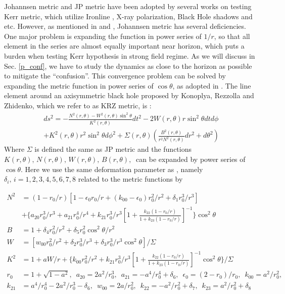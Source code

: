 \documentclass{article}
\begin{document}
Johannsen metric and JP metric have been adopted by several works on testing Kerr metric, which utilize Ironline\cite{t1_Iron} \cite{t4_Iron}, X-ray polarization\cite{t2_XrayPol}, Black Hole shadows\cite{t3_BHShadow} and etc. However, as mentioned in \cite{johannsen_diff} and \cite {KRZ}, Johannsen metric has several deficiencies. One major problem is expanding the function in power series of $1/r$, so that all element in the series are almost equally important near horizon, which puts a burden when testing Kerr hypothesis in strong field regime. As we will discuss in Sec. \ref{p_conf}, we have to study the dynamics as close to the horizon as possible to mitigate the ``confusion''. This convergence problem can be solved by expanding the metric function in power series of $\cos \theta$, as adopted in \cite{KRZ}. The line element around an axisymmetric black hole proposed by Konoplya, Rezzolla and Zhidenko, which we refer to as KRZ metric, is \cite{KRZ}:
\begin{equation}
\begin{aligned}
	ds^2=-\frac{N^2(r,\theta)-W^2(r,\theta)\sin^2\theta}{K^2(r,\theta)} dt^2-2W(r,\theta)r\sin^2\theta dtd\phi \\+ K^2(r,\theta) r^2\sin^2\theta d\phi^2  +\Sigma(r,\theta)(\frac{B^2(r,\theta)}{r^2 N^2(r,\theta)} dr^2+d\theta^2)
\end{aligned}
\end{equation}
Where $\Sigma$ is defined the same as JP metric and the functions $K(r,\theta),\, N(r,\theta),\, W(r,\theta),\, B(r,\theta),\ $ can be expanded by power series of $\cos\theta$. Here we use the same deformation parameter as \cite{cosimoKRZ}, namely $\delta_i, \, i=1,2,3,4,5,6,7,8$ related to the metric functions by

\begin{equation}
\begin{aligned}
N^2&=(1-r_0/r)[ 1-\epsilon_0r_0/r +(k_{00}-\epsilon_0)r_0^2/r^2 +\delta_1 r_0^3/r^3 ] \\
&+ \{ a_{20} r_0^3/r^3 +a_{21} r_0^4/r^4 + k_{21}r_0^3/r^3[ 1+\frac{k_{22}(1-r_0/r) }{1+k_{23}(1-r_0/r)} ]^{-1}   \} \cos^2\theta   \\
B&=1+\delta_4r_0^2 /r^2 +\delta_5r_0^2 \cos^2\theta /r^2\\
W&=[w_{00}r_0^2 /r^2 +\delta_2 r_0^3/r^3 +\delta_3 r_0^3/r^3 \cos^2\theta ]/\Sigma\\
K^2&= 1+aW/r+\{k_{00}r_0^2/r^2 +k_{21}r_0^3/r^3 [ 1+\frac{k_{22}(1-r_0/r) }{1+k_{23}(1-r_0/r)} ]^{-1} \cos^2\theta \}/\Sigma\\
r_0&=1+\sqrt{1-a^2},\,\,\, a_{20}=2a^2/r_0^3,\,\,\, a_{21}=-a^4/r_0^4 +\delta_6 ,\,\,\, \epsilon_0=(2-r_0)/r_0,\,\,\, k_{00}=a^2/r_0^2,\\
 k_{21}&=a^4/r_0^4 -2a^2/r_0^3-\delta_6,\,\,\, w_{00}=2a/r_0^2,\,\,\, k_{22}=-a^2/r_0^2 +\delta_7,\,\,\,  k_{23} = a^2/r_0^2 +\delta_8
\end{aligned}
\end{equation}
\end{document}
